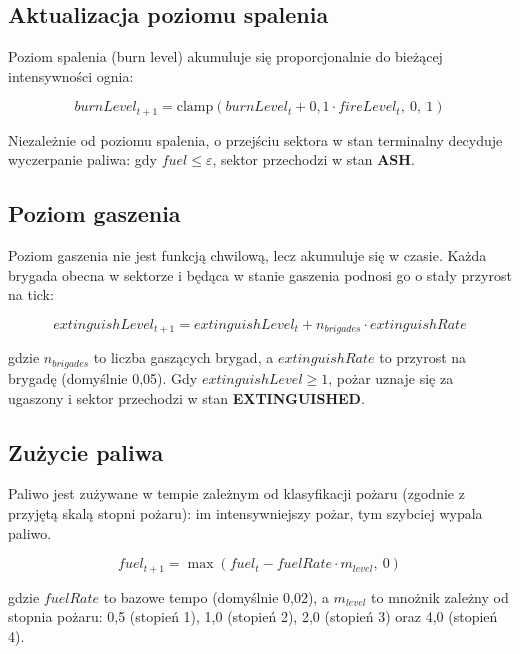 \documentclass[11pt,a4paper]{article}
\begin{document}
\subsection{Aktualizacja poziomu spalenia}

Poziom spalenia (burn level) akumuluje się proporcjonalnie do bieżącej intensywności ognia:

\begin{equation}
burnLevel_{t+1} = \mathrm{clamp}\!\left(burnLevel_t + 0{,}1 \cdot fireLevel_t,\ 0,\ 1\right)
\end{equation}

Niezależnie od poziomu spalenia, o przejściu sektora w stan terminalny decyduje wyczerpanie paliwa: gdy $fuel \leq \varepsilon$, sektor przechodzi w stan \textbf{ASH}.

\subsection{Poziom gaszenia}

Poziom gaszenia nie jest funkcją chwilową, lecz akumuluje się w czasie. Każda brygada obecna w sektorze i będąca w stanie gaszenia podnosi go o stały przyrost na tick:

\begin{equation}
extinguishLevel_{t+1} = extinguishLevel_t + n_{brigades} \cdot extinguishRate
\end{equation}

gdzie $n_{brigades}$ to liczba gaszących brygad, a $extinguishRate$ to przyrost na brygadę (domyślnie 0,05). Gdy $extinguishLevel \geq 1$, pożar uznaje się za ugaszony i sektor przechodzi w stan \textbf{EXTINGUISHED}.

\subsection{Zużycie paliwa}

Paliwo jest zużywane w tempie zależnym od klasyfikacji pożaru (zgodnie z przyjętą skalą stopni pożaru): im intensywniejszy pożar, tym szybciej wypala paliwo.

\begin{equation}
fuel_{t+1} = \max\!\left(fuel_t - fuelRate \cdot m_{level},\ 0\right)
\end{equation}

gdzie $fuelRate$ to bazowe tempo (domyślnie 0,02), a $m_{level}$ to mnożnik zależny od stopnia pożaru: 0,5 (stopień 1), 1,0 (stopień 2), 2,0 (stopień 3) oraz 4,0 (stopień 4).
\end{document}
